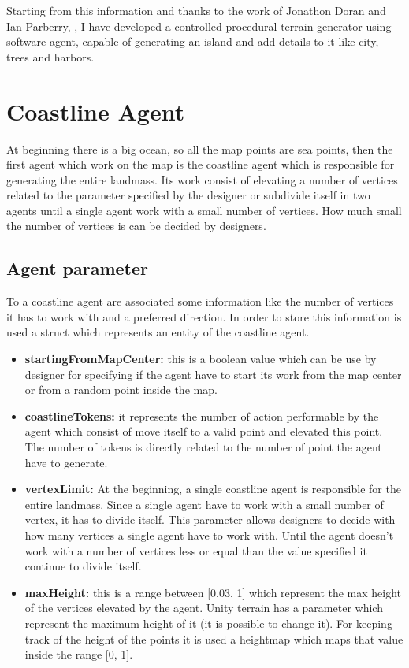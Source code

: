 \documentclass[12pt]{article}
\begin{document}
    Starting from this information and thanks to the work of Jonathon Doran and Ian Parberry, \cite{article}, I have developed a controlled procedural terrain generator using software 
    agent, capable of generating an island and add details to it like city, trees and harbors.

    \newpage

    \section{Coastline Agent}
    At beginning there is a big ocean, so all the map points are sea points, then the first agent which work on the map is the coastline agent which is responsible for 
    generating the entire landmass. Its work consist of elevating a number of vertices related to the parameter specified by the designer or subdivide itself in two agents
    until a single agent work with a small number of vertices. How much small the number of vertices is can be decided by designers.

    \subsection{Agent parameter}
    To a coastline agent are associated some information like the number of vertices it has to work with and a preferred direction. In order to store this information is used
    a struct which represents an entity of the coastline agent. 

    \begin{itemize}
        \item \textbf{startingFromMapCenter:} this is a boolean value which can be use by designer for specifying if the agent have to start its work from the map center or
        from a random point inside the map.
        \item \textbf{coastlineTokens:} it represents the number of action performable by the agent which consist of move itself to a valid point and elevated this point. 
        The number of tokens is directly related to the number of point the agent have to generate.
        \item \textbf{vertexLimit:} At the beginning, a single coastline agent is responsible for the entire landmass. Since a single agent have to work with a small number
        of vertex, it has to divide itself. This parameter allows designers to decide with how many vertices a single agent have to work with. Until the agent doesn't
        work with a number of vertices less or equal than the value specified it continue to divide itself.
        \item \textbf{maxHeight:} this is a range between [0.03, 1] which represent the max height of the vertices elevated by the agent. Unity terrain has a parameter which 
        represent the maximum height of it (it is possible to change it). For keeping track of the height of the points it is used a heightmap which maps that value inside 
        the range [0, 1].
    \end{itemize}
\end{document}

